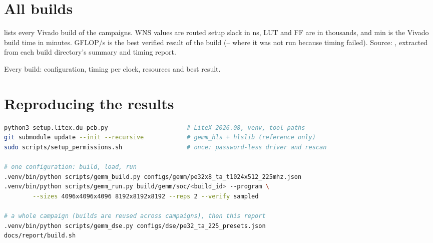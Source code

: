 \section{All builds}
\label{app:builds}
 lists every Vivado build of the campaigns. WNS values are routed setup slack in ns, LUT and FF
are in thousands, and min is the Vivado build time in minutes. GFLOP/s is the best verified result of the build
(-- where it was not run because timing failed). Source: , extracted from each build
directory's summary and timing report.

\begin{table}[ht]
\centering\scriptsize\setlength{\tabcolsep}{3pt}
\caption{Every build: configuration, timing per clock, resources and best result.}
\label{tab:builds}
\end{table}

\section{Reproducing the results}
\label{app:repro}
\begin{lstlisting}[language=bash, caption={From a clean checkout (Vivado/Vitis 2026.1, the card in a PCIe slot).}]
python3 setup.litex.du-pcb.py                      # LiteX 2026.08, venv, tool paths
git submodule update --init --recursive            # gemm_hls + hlslib (reference only)
sudo scripts/setup_permissions.sh                  # once: password-less driver and rescan

# one configuration: build, load, run
.venv/bin/python scripts/gemm_build.py configs/gemm/pe32x8_ta_t1024x512_225mhz.json
.venv/bin/python scripts/gemm_run.py build/gemm/soc/<build_id> --program \
        --sizes 4096x4096x4096 8192x8192x8192 --reps 2 --verify sampled

# a whole campaign (builds are reused across campaigns), then this report
.venv/bin/python scripts/gemm_dse.py configs/dse/pe32_ta_225_presets.json
docs/report/build.sh
\end{lstlisting}

